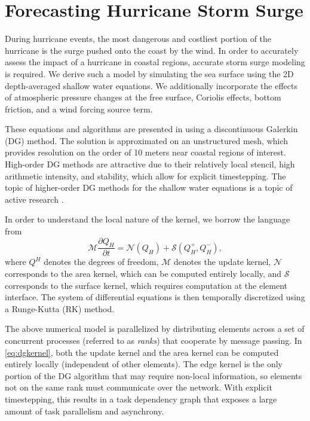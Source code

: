 \section{Forecasting Hurricane Storm Surge}
\label{sec:dgswem}

During hurricane events, the most dangerous and costliest portion of the hurricane is the surge pushed onto the coast by the wind. In order to accurately assess the impact of a hurricane in coastal regions, accurate storm surge modeling is required.  We derive such a model by simulating the sea surface using the 2D depth-averaged shallow water equations. 
We additionally incorporate the effects of atmospheric pressure changes at the free surface, Coriolis effects, bottom friction, and a wind forcing source term.

These equations and algorithms are presented in \cite{Dawson2011} using a discontinuous Galerkin (DG) method. The solution is approximated on an unstructured mesh, which provides resolution on the order of 10 meters near coastal regions of interest.
High-order DG methods are attractive due to their relatively local stencil, high arithmetic intensity, and stability, which allow for explicit timestepping. The topic of higher-order DG methods for the shallow water equations is a topic of active research \cite{Gandham2015,Brus2015,Marras2018,Brus2017}.

In order to understand the local nature of the kernel, we borrow the language from \cite{Gandham2015}
\begin{equation}
\mathcal{M} \frac{\partial Q_H}{ \partial t} = \mathcal{N}(Q_H) + \mathcal{S}(Q_H^{+},Q_H^{-}),
\label{eq:dgkernel}
\end{equation}
where $Q^H$ denotes the degrees of freedom, $\mathcal{M}$ denotes the update kernel, $\mathcal{N}$ corresponds to the area kernel, which can be computed entirely locally, and $\mathcal{S}$ corresponds to the surface kernel, which requires computation at the element interface. The system of differential equations is then temporally discretized using a Runge-Kutta (RK) method.

The above numerical model is parallelized by distributing elements across a set of concurrent processes (referred to as {\em ranks}) that cooperate by message passing.
In \eqref{eq:dgkernel}, both the update kernel and the area kernel can be computed entirely locally (independent of other elements).
The edge kernel is the only portion of the DG algorithm that may require non-local information, so elements not on the same rank must communicate over the network.
With explicit timestepping, this results in a task dependency graph that exposes a large amount of task parallelism and asynchrony.


